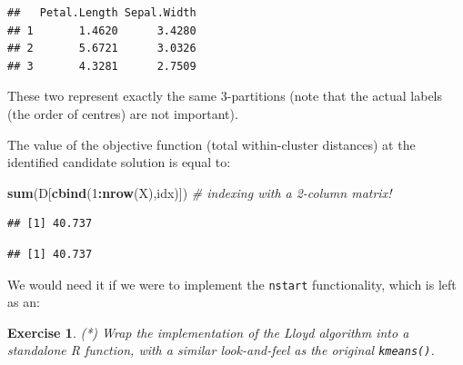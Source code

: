 \documentclass[10pt,b5paper,krantz1]{krantz}
\newenvironment{Shaded}{\begin{snugshade}}{\end{snugshade}}
\newcommand{\CommentTok}[1]{\textcolor[rgb]{0.37,0.37,0.37}{\textit{#1}}}
\newcommand{\DecValTok}[1]{\textcolor[rgb]{0.06,0.06,0.06}{#1}}
\newcommand{\KeywordTok}[1]{\textcolor[rgb]{0.27,0.27,0.27}{\textbf{#1}}}
\newcommand{\NormalTok}[1]{#1}
\newcommand{\OperatorTok}[1]{\textcolor[rgb]{0.43,0.43,0.43}{\textbf{#1}}}
\newtheorem{exercise}{Exercise}[chapter]
\begin{document}
\begin{Shaded}
\end{Shaded}

\begin{verbatim}
##   Petal.Length Sepal.Width
## 1       1.4620      3.4280
## 2       5.6721      3.0326
## 3       4.3281      2.7509
\end{verbatim}

These two represent exactly the same 3-partitions
(note that the actual labels (the order of centres) are not important).

The value of the objective function (total within-cluster distances)
at the identified candidate solution
is equal to:

\begin{Shaded}
\begin{Highlighting}[]
\KeywordTok{sum}\NormalTok{(D[}\KeywordTok{cbind}\NormalTok{(}\DecValTok{1}\OperatorTok{:}\KeywordTok{nrow}\NormalTok{(X),idx)]) }\CommentTok{# indexing with a 2-column matrix!}
\end{Highlighting}
\end{Shaded}

\begin{verbatim}
## [1] 40.737
\end{verbatim}

\begin{Shaded}
\end{Shaded}

\begin{verbatim}
## [1] 40.737
\end{verbatim}

We would need it if we were to implement the \texttt{nstart} functionality,
which is left as an:

\begin{exercise}

(*) Wrap the implementation of the Lloyd algorithm into a standalone R function,
with a similar look-and-feel as the original \texttt{kmeans()}.

\end{exercise}
\end{document}
